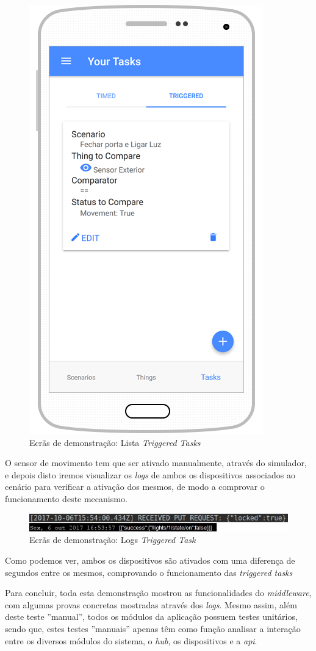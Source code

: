 \begin{figure}[H]
  \centering
        \includegraphics[scale=0.75]{img/demo/show_triggered_task.png}
  \caption{Ecrãs de demonstração: Lista \textit{Triggered Tasks}}
\end{figure}

O sensor de movimento tem que ser ativado manualmente, através do simulador, e depois disto iremos visualizar os \textit{logs} de ambos os dispositivos associados ao cenário para verificar a ativação dos mesmos, de modo a comprovar o funcionamento deste mecanismo.

\begin{figure}[H]
  \centering
        \includegraphics[scale=0.6]{img/demo/logs_triggered_task.jpg}
  \caption{Ecrãs de demonstração: Logs \textit{Triggered Task}}
\end{figure}

Como podemos ver, ambos os dispositivos são ativados com uma diferença de segundos entre os mesmos, comprovando o funcionamento das \textit{triggered tasks}

Para concluir, toda esta demonstração mostrou as funcionalidades do \textit{middleware}, com algumas provas concretas mostradas através dos \textit{logs}. Mesmo assim, além deste teste ''manual'', todos os módulos da aplicação possuem testes unitários, sendo que, estes testes ''manuais'' apenas têm como função analisar a interação entre os diversos módulos do sistema, o \textit{hub}, os dispositivos e a \textit{api}.